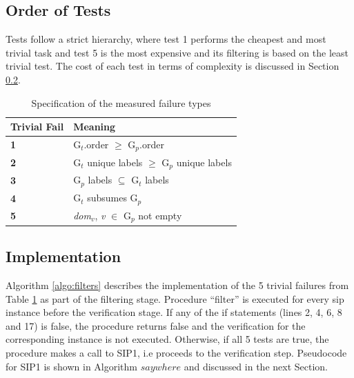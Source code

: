 \documentclass{l4proj}
\begin{document}
\subsection{Order of Tests}

Tests follow a strict hierarchy, where test 1 performs the cheapest and most trivial task and test 5 is the most expensive and its filtering is based on the least trivial test. The cost of each test in terms of complexity is discussed in Section \ref{sec:trivialFailsImplementation}.



\begin{table}
\centering
\renewcommand{\arraystretch}{1.5}%
\begin{tabular}{ >{\centering\bfseries}m{1in} >{\centering\arraybackslash}m{2.3in}} 
\toprule
  Trivial Fail & Meaning\\
\midrule
 \textbf{1} & G$_{t}$.order $\geq$ G$_{p}$.order\\
 \rowcolor{Gray}
 \textbf{2} & G$_{t}$ unique labels $\geq$ G$_{p}$ unique labels\\
 \textbf{3} & G$_{p}$ labels $\subseteq$ G$_{t}$ labels\\
 \rowcolor{Gray}
 \textbf{4} & G$_{t}$ subsumes G$_{p}$\\
 \textbf{5} & \textit{dom$_{v}$}, \textit{v} $\in$ G$_{p}$ not empty\\
 \bottomrule
\end{tabular}
\caption{Specification of the measured failure types}
\label{table:failures}
\end{table}        

\subsection{Implementation}
\label{sec:trivialFailsImplementation}
Algorithm \ref{algo:filters} describes the implementation of the 5 trivial failures from Table \ref{table:failures} as part of the filtering stage. Procedure ``filter'' is executed for every \gls{sip} instance before the verification stage. If any of the if statements (lines 2, 4, 6, 8 and 17) is false, the procedure returns false and the verification for the corresponding instance is not executed. Otherwise, if all 5 tests are true, the procedure makes a call to SIP1, i.e proceeds to the verification step. Pseudocode for SIP1 is shown in Algorithm $say where$ and discussed in the next Section.
\end{document}

